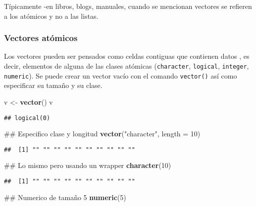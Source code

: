 \documentclass[]{article}
\newenvironment{Shaded}{\begin{snugshade}}{\end{snugshade}}
\newcommand{\KeywordTok}[1]{\textcolor[rgb]{0.13,0.29,0.53}{\textbf{#1}}}
\newcommand{\DataTypeTok}[1]{\textcolor[rgb]{0.13,0.29,0.53}{#1}}
\newcommand{\DecValTok}[1]{\textcolor[rgb]{0.00,0.00,0.81}{#1}}
\newcommand{\StringTok}[1]{\textcolor[rgb]{0.31,0.60,0.02}{#1}}
\newcommand{\NormalTok}[1]{#1}
\begin{document}
Típicamente -en libros, blogs, manuales, cuando se mencionan vectores se
refieren a los atómicos y no a las listas.

\subsubsection{Vectores atómicos}\label{vectores-atomicos}

Los vectores pueden ser pensados como celdas contiguas que contienen
datos \parencite{rmanual}, es decir, elementos de alguna de las clases
atómicas (\texttt{character}, \texttt{logical}, \texttt{integer},
\texttt{numeric}). Se puede crear un vector vacío con el comando
\texttt{vector()} así como especificar su tamaño y su clase.

\begin{Shaded}
\begin{Highlighting}[]
\NormalTok{v <-}\StringTok{ }\KeywordTok{vector}\NormalTok{()}
\NormalTok{v }
\end{Highlighting}
\end{Shaded}

\begin{verbatim}
## logical(0)
\end{verbatim}

\begin{Shaded}
\begin{Highlighting}[]
\NormalTok{## Especifico clase y longitud}
\KeywordTok{vector}\NormalTok{(}\StringTok{"character"}\NormalTok{, }\DataTypeTok{length =} \DecValTok{10}\NormalTok{)}
\end{Highlighting}
\end{Shaded}

\begin{verbatim}
##  [1] "" "" "" "" "" "" "" "" "" ""
\end{verbatim}

\begin{Shaded}
\begin{Highlighting}[]
\NormalTok{## Lo mismo pero usando un wrapper}
\KeywordTok{character}\NormalTok{(}\DecValTok{10}\NormalTok{)}
\end{Highlighting}
\end{Shaded}

\begin{verbatim}
##  [1] "" "" "" "" "" "" "" "" "" ""
\end{verbatim}

\begin{Shaded}
\begin{Highlighting}[]
\NormalTok{## Numerico de tamaño 5}
\KeywordTok{numeric}\NormalTok{(}\DecValTok{5}\NormalTok{)}
\end{Highlighting}
\end{Shaded}
\end{document}
